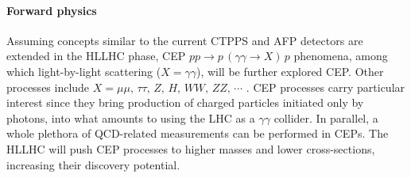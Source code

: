 \documentclass[11pt]{article}
\begin{document}
\paragraph{Forward physics}

Assuming concepts similar to the current \ac{CTPPS} \cite{ctpps_tdr} and \ac{AFP} \cite{afp_tdr} detectors are extended in the \ac{HLLHC} phase, \ac{CEP} \(pp \rightarrow p\,(\gamma\gamma\rightarrow X)\,p\) phenomena, among which light-by-light scattering (\(X = \gamma\gamma\)), will be further explored \ac{CEP}.
Other processes include \(X = \mu\mu,\,\tau\tau,\,Z,\,H,\,WW,\,ZZ,\,\cdots\) \cite{ctpps_varela}.
\ac{CEP} processes carry particular interest since they bring production of charged particles initiated only by photons, into what amounts to using the \ac{LHC} as a \(\gamma\gamma\) collider.
In parallel, a whole plethora of \ac{QCD}-related measurements can be performed in \acp{CEP}.
The \ac{HLLHC} will push \ac{CEP} processes to higher masses and lower cross-sections, increasing their discovery potential.
\end{document}
